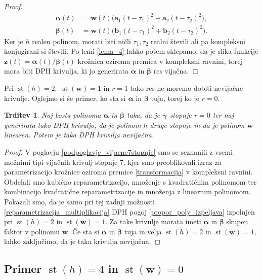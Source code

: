 \documentclass[12pt,a4paper,twoside]{article}
\theoremstyle{definition} %
\theoremstyle{plain} %
\newtheorem{trditev}[definicija]{Trditev}
\theoremstyle{primerstyle}
\numberwithin{equation}{section}  %
\newcommand{\aV}{\mathbf{a}}
\newcommand{\bV}{\mathbf{b}}
\newcommand{\wV}{\mathbf{w}}
\newcommand{\zV}{\mathbf{z}}
\newcommand{\balpha}{\boldsymbol \alpha}
\newcommand{\bbeta}{\boldsymbol \beta}
\newcommand{\bgamma}{\boldsymbol \gamma}
\DeclareMathOperator{\st}{st}
\begin{document}
\begin{proof}
	\begin{align*}
		\balpha(t)&=\wV(t)\big(\aV_1(t-\tau_1)^2+\aV_2(t-\tau_2)^2\big),\\
		\bbeta(t)&=\wV(t)\big(\bV_1(t-\tau_1)^2+\bV_2(t-\tau_2)^2\big).
	\end{align*}
	Ker je $h$ realen polinom, morati biti ničli $\tau_1,\tau_2$ realni števili ali pa kompleksni konjugirani si števili. Po lemi \ref{lema_4} lahko potem sklepamo, da je slika funkcije $\zV(t)=\balpha(t)/\bbeta(t)$ krožnica oziroma premica v kompleksni ravnini, torej mora biti DPH krivulja, ki jo generirata $\balpha$ in $\bbeta$ res vijačna.
\end{proof}
Pri $\st(h)=2,$ $\st(\wV)=1$ in $r=1$ tako res ne moremo dobiti nevijačne krivulje. Oglejmo si še primer, ko sta si $\balpha$ in $\bbeta$ tuja, torej ko je $r=0.$
\begin{trditev}
	\label{locevanje_h2w1_trditev2}
	Naj bosta polinoma $\balpha$ in $\bbeta$ taka, da je $\bgamma$ stopnje $r=0$ ter naj generirata tako DPH krivuljo, da je polinom $h$ druge stopnje in da je polinom $\wV$ linearen. Potem je taka DPH krivulja nevijačna.
\end{trditev}
\begin{proof}
	V poglavju \ref{podpoglavje_vijacne7stopnje} smo se seznanili z vsemi možnimi tipi vijačnih krivulj stopnje 7, kjer smo preoblikovali izraz za parametrizacijo krožnice oziroma premice \eqref{transformacija} v kompleksni ravnini. Obdelali smo kubično reparametrizacijo, množenje s kvadratičnim polinomom ter kombinacijo kvadratične reparametrizacije in množenja z linearnim polinomom. Pokazali smo, da je samo pri tej zadnji možnosti \ref{reparametrizacija_multiplikacija} DPH pogoj \eqref{propor_poly_izpeljava} izpolnjen pri $\st(h)=2$ in $\st(\wV)=1.$ Za take krivulje morata imeti $\balpha$ in $\bbeta$ skupen faktor v polinomu $\wV.$ Če sta si $\balpha$ in $\bbeta$ tuja in velja $\st(h)=2$ in $\st(\wV)=1,$ lahko zaključimo, da je taka krivulja nevijačna.
\end{proof}

\subsection{Primer \texorpdfstring{$\st(h)=4$}{st(h)=4} in \texorpdfstring{$\st(\wV)=0$}{st(w)=0}}
\label{locevanje_h4w0}
\end{document}
